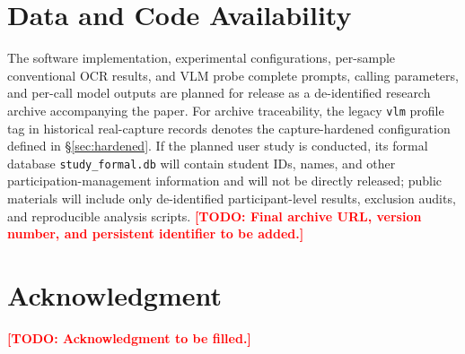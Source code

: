 \documentclass{ieeeaccess}
\newcommand{\TODO}[1]{\textcolor{red}{\textbf{[TODO: #1]}}}
\begin{document}
\section*{Data and Code Availability}

The software implementation, experimental configurations, per-sample conventional OCR results, and VLM probe complete prompts, calling parameters, and per-call model outputs are planned for release as a de-identified research archive accompanying the paper. For archive traceability, the legacy \texttt{vlm} profile tag in historical real-capture records denotes the capture-hardened configuration defined in \S\ref{sec:hardened}. If the planned user study is conducted, its formal database \texttt{study\_formal.db} will contain student IDs, names, and other participation-management information and will not be directly released; public materials will include only de-identified participant-level results, exclusion audits, and reproducible analysis scripts. \TODO{Final archive URL, version number, and persistent identifier to be added.}

\section*{Acknowledgment}
\TODO{Acknowledgment to be filled.}\EOD


\clearpage



\vfill
\end{document}
